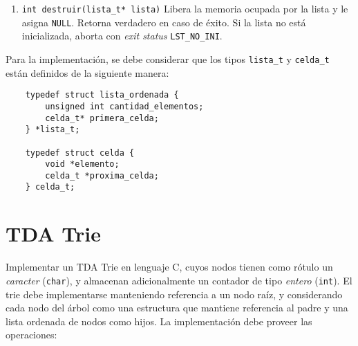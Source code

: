 \documentclass[12pt,a4paper]{article}
\begin{document}
\begin{enumerate}
	
	\item \texttt{int destruir(lista\_t* lista)} Libera la memoria ocupada
	por la lista y le asigna \texttt{NULL}. Retorna verdadero en caso de éxito.
	Si la lista no está inicializada, aborta con \emph{exit status}
	\texttt{LST\_NO\_INI}.
	
\end{enumerate}

Para la implementación, se debe considerar que los tipos \texttt{lista\_t} y \texttt{celda\_t} están definidos de la siguiente manera:

\begin{verbatim}
    typedef struct lista_ordenada {
        unsigned int cantidad_elementos;
        celda_t* primera_celda;
    } *lista_t;

    typedef struct celda {
        void *elemento;
        celda_t *proxima_celda;
    } celda_t;
\end{verbatim}
\section{TDA Trie}

Implementar un TDA Trie en lenguaje C, cuyos nodos tienen como rótulo un \emph{caracter} (\texttt{char}), y almacenan adicionalmente un contador de tipo \emph{entero} (\texttt{int}). El trie debe implementarse manteniendo referencia a un nodo raíz, y considerando cada nodo del árbol como una estructura que mantiene referencia al padre y una lista ordenada de nodos como hijos. La implementación debe proveer las operaciones:
\end{document}
